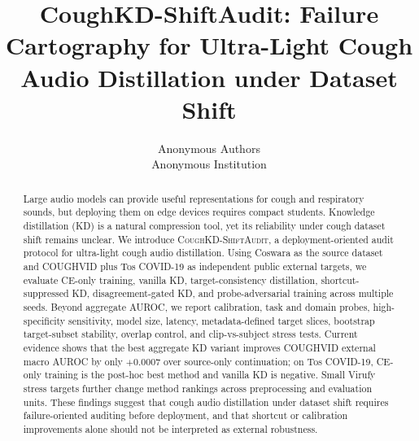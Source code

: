 \documentclass[letterpaper,10pt]{article}
\title{\textbf{CoughKD-ShiftAudit: Failure Cartography for Ultra-Light Cough Audio Distillation under Dataset Shift}}
\author{Anonymous Authors\\Anonymous Institution}
\date{}
\begin{document}
\maketitle

\begin{abstract}
Large audio models can provide useful representations for cough and respiratory sounds, but deploying them on edge devices requires compact students. Knowledge distillation (KD) is a natural compression tool, yet its reliability under cough dataset shift remains unclear. We introduce \textsc{CoughKD-ShiftAudit}, a deployment-oriented audit protocol for ultra-light cough audio distillation. Using Coswara as the source dataset and COUGHVID plus Tos COVID-19 as independent public external targets, we evaluate CE-only training, vanilla KD, target-consistency distillation, shortcut-suppressed KD, disagreement-gated KD, and probe-adversarial training across multiple seeds. Beyond aggregate AUROC, we report calibration, task and domain probes, high-specificity sensitivity, model size, latency, metadata-defined target slices, bootstrap target-subset stability, overlap control, and clip-vs-subject stress tests. Current evidence shows that the best aggregate KD variant improves COUGHVID external macro AUROC by only $+0.0007$ over source-only continuation; on Tos COVID-19, CE-only training is the post-hoc best method and vanilla KD is negative. Small Virufy stress targets further change method rankings across preprocessing and evaluation units. These findings suggest that cough audio distillation under dataset shift requires failure-oriented auditing before deployment, and that shortcut or calibration improvements alone should not be interpreted as external robustness.
\end{abstract}











\end{document}
